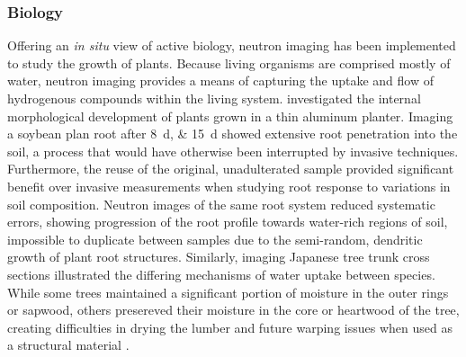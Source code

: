 \documentclass[../../../main.tex]{subfiles}%
\begin{document}
%
    \subsubsection{Biology}%
    \label{sec:chapter-1:motivation:biology}%
    Offering an \textit{in situ} view of active biology, neutron imaging has been implemented to study the growth of plants.
    Because living organisms are comprised mostly of water, neutron imaging provides a means of capturing the uptake and flow of hydrogenous compounds within the living system.
    \citeauthor*{book:Anderson_2009} investigated the internal morphological development of plants grown in a thin aluminum planter.
    Imaging a soybean plan root after \SIlist[list-units = repeat]{8;15}{\day} showed extensive root penetration into the soil, a process that would have otherwise been interrupted by invasive techniques.
    Furthermore, the reuse of the original, unadulterated sample provided significant benefit over invasive measurements when studying root response to variations in soil composition.
    Neutron images of the same root system reduced systematic errors, showing progression of the root profile towards water-rich regions of soil, impossible to duplicate between samples due to the semi-random, dendritic growth of plant root structures. 
    Similarly, imaging Japanese tree trunk cross sections illustrated the differing mechanisms of water uptake between species.
    While some trees maintained a significant portion of moisture in the outer rings or sapwood, others presereved their moisture in the core or heartwood of the tree, creating difficulties in drying the lumber and future warping issues when used as a structural material \cite{book:Anderson_2009}.
\end{document}
